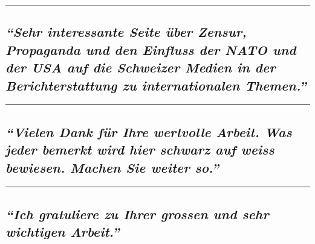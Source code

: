 \begin{center}\rule{0.5\linewidth}{\linethickness}\end{center}

\hypertarget{sehr-interessante-seite-uxfcber-zensur-propaganda-und-den-einfluss-der-nato-und-der-usa-auf-die-schweizer-medien-in-der-berichterstattung-zu-internationalen-themen}{%
\subsection{\texorpdfstring{\emph{``Sehr interessante Seite über Zensur,
Propaganda und den Einfluss der NATO und der USA auf die Schweizer
Medien in der Berichterstattung zu internationalen
Themen.''}}{``Sehr interessante Seite über Zensur, Propaganda und den Einfluss der NATO und der USA auf die Schweizer Medien in der Berichterstattung zu internationalen Themen.''}}\label{sehr-interessante-seite-uxfcber-zensur-propaganda-und-den-einfluss-der-nato-und-der-usa-auf-die-schweizer-medien-in-der-berichterstattung-zu-internationalen-themen}}

\begin{center}\rule{0.5\linewidth}{\linethickness}\end{center}

\hypertarget{vielen-dank-fuxfcr-ihre-wertvolle-arbeit-was-jeder-bemerkt-wird-hier-schwarz-auf-weiss-bewiesen-machen-sie-weiter-so}{%
\subsection{\texorpdfstring{\emph{``Vielen Dank für Ihre wertvolle
Arbeit. Was jeder bemerkt wird hier schwarz auf weiss bewiesen. Machen
Sie weiter
so.''}}{``Vielen Dank für Ihre wertvolle Arbeit. Was jeder bemerkt wird hier schwarz auf weiss bewiesen. Machen Sie weiter so.''}}\label{vielen-dank-fuxfcr-ihre-wertvolle-arbeit-was-jeder-bemerkt-wird-hier-schwarz-auf-weiss-bewiesen-machen-sie-weiter-so}}

\begin{center}\rule{0.5\linewidth}{\linethickness}\end{center}

\hypertarget{ich-gratuliere-zu-ihrer-grossen-und-sehr-wichtigen-arbeit}{%
\subsection{\texorpdfstring{\emph{``Ich gratuliere zu Ihrer grossen und
sehr wichtigen
Arbeit.''}}{``Ich gratuliere zu Ihrer grossen und sehr wichtigen Arbeit.''}}\label{ich-gratuliere-zu-ihrer-grossen-und-sehr-wichtigen-arbeit}}


